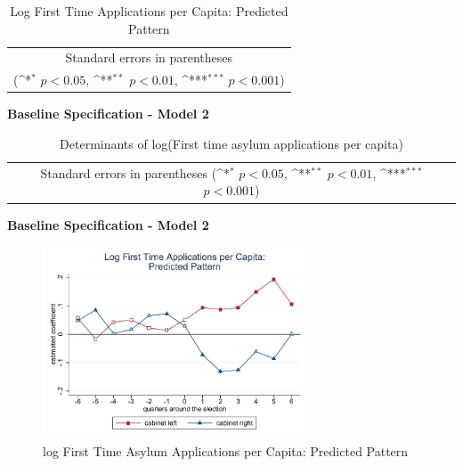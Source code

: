 \documentclass[10pt,a4paper]{scrartcl}
\begin{document}
\begin{table}[!ht]\centering
\renewcommand{\arraystretch}{1.25}
\def\sym#1{\ifmmode^{#1}\else\(^{#1}\)\fi}
\caption{Log First Time Applications per Capita: Predicted Pattern}
\begin{tabular}[]{l*{2}{c}}
	\hline\hline
	
	\hline\hline
	\multicolumn{3}{c}{\footnotesize Standard errors in parentheses} \\
	\multicolumn{3}{c}{\footnotesize (\sym{*} \(p<0.05\), \sym{**} \(p<0.01\), \sym{***} \(p<0.001\))}\\
\end{tabular}
\end{table}

\clearpage
\textbf{Baseline Specification - Model 2}
\begin{table}[!ht]\centering
	\scriptsize
	\renewcommand{\arraystretch}{1.1}
	\def\sym#1{\ifmmode^{#1}\else\(^{#1}\)\fi}
	\caption{Determinants of log(First time asylum applications per capita)}
	\begin{tabular}{l*{3}{c}}
		\hline\hline
		
		\hline\hline
		\multicolumn{4}{c}{\footnotesize Standard errors in parentheses (\sym{*} \(p<0.05\), \sym{**} \(p<0.01\), \sym{***} \(p<0.001\))}\\
	\end{tabular}
\end{table}


\clearpage
\textbf{Baseline Specification - Model 2}
\begin{figure}[!ht]
	\centering
	\includegraphics[width=0.7\textwidth]{figures_edited/app_graph2_baseline.pdf}
	\caption{log First Time Asylum Applications per Capita: Predicted Pattern}
\end{figure}
\end{document}
